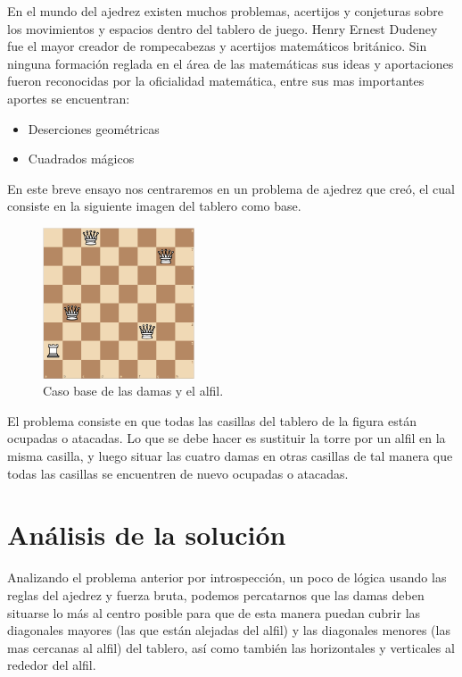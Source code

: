 \documentclass[12pt]{article}
\begin{document}
En el mundo del ajedrez existen muchos problemas, acertijos y conjeturas sobre los movimientos y espacios dentro del tablero de juego. Henry Ernest Dudeney fue el mayor creador de rompecabezas y acertijos matemáticos británico. Sin ninguna formación reglada en el área de las matemáticas sus ideas y aportaciones fueron reconocidas por la oficialidad matemática, entre sus mas importantes aportes se encuentran:
\begin{itemize}
    \item Deserciones geométricas
    \item Cuadrados mágicos 
\end{itemize}

En este breve ensayo nos centraremos en un problema de ajedrez que creó, el cual consiste en la siguiente imagen del tablero como base.

\begin{figure}[h]
\centering
\includegraphics[width=0.4\textwidth]{1.png}
\caption{\label{fig:xx}Caso base de las damas y el alfil.}
\end{figure}

El problema consiste en que todas las casillas del tablero de la figura están ocupadas o atacadas. Lo que se debe hacer es sustituir la torre por un alfil en la misma casilla, y luego situar las cuatro damas en otras casillas de tal manera que todas las casillas se encuentren de nuevo ocupadas o atacadas.

\section{Análisis de la solución}

Analizando el problema anterior por introspección, un poco de lógica usando las reglas del ajedrez y fuerza bruta, podemos percatarnos que las damas deben situarse lo más al centro posible para que de esta manera puedan cubrir las diagonales mayores (las que están alejadas del alfil) y las diagonales menores (las mas cercanas al alfil) del tablero, así como también las horizontales y verticales al rededor del alfil.\\
\end{document}
